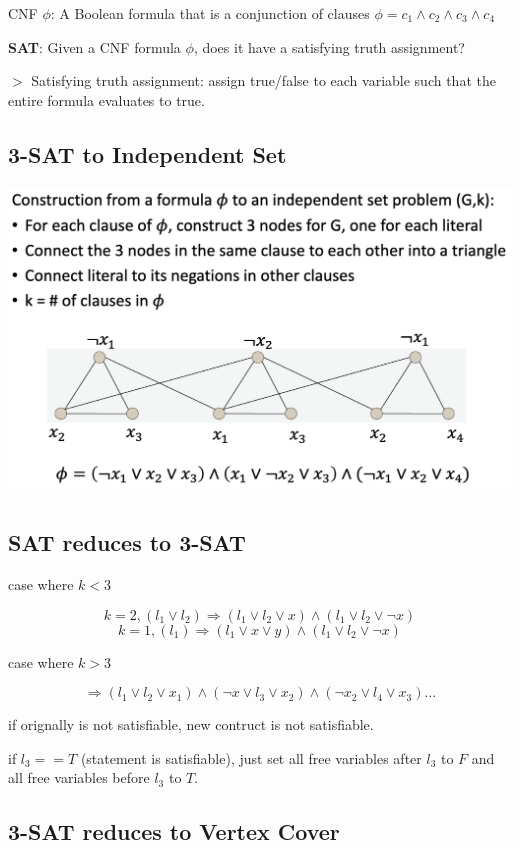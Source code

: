 \documentclass[12pt,a4paper]{article}
\newcommand{\remark}[1]{
    {\small $>$ {\color{blue} #1}}
}
\begin{document}
CNF $\phi$: A Boolean formula that is a conjunction of clauses \(\phi = c_1 \land c_2 \land c_3 \land c_4\)

\textbf{SAT}: Given a CNF formula $\phi$, does it have a satisfying truth assignment?

\remark{Satisfying truth assignment: assign true/false to each variable such that the entire formula evaluates to true.}

\subsection*{3-SAT to Independent Set}

\includegraphics[width=\textwidth]{./images/3sat_reduce_to_is.png}

\subsection*{SAT reduces to 3-SAT}

case where $k<3$

\[k = 2, (l_1 \lor l_2) \Rightarrow (l_1 \lor l_2 \lor x) \land (l_1 \lor l_2 \lor \neg x)\]
\[k = 1, (l_1) \Rightarrow (l_1 \lor x \lor y) \land (l_1 \lor l_2 \lor \neg x)\]

case where $ k>3$

\[ \Rightarrow (l_1 \lor l_2 \lor x_1) \land (\neg x \lor l_3 \lor x_2) \land (\neg x_2 \lor l_4 \lor x_3)\dots\]

if orignally is not satisfiable, new contruct is not satisfiable.

if $l_3 == T$ (statement is satisfiable), just set all free variables after $l_3$ to $F$ and all free variables before $l_3$ to $T$.

\subsection*{3-SAT reduces to Vertex Cover}
\end{document}
